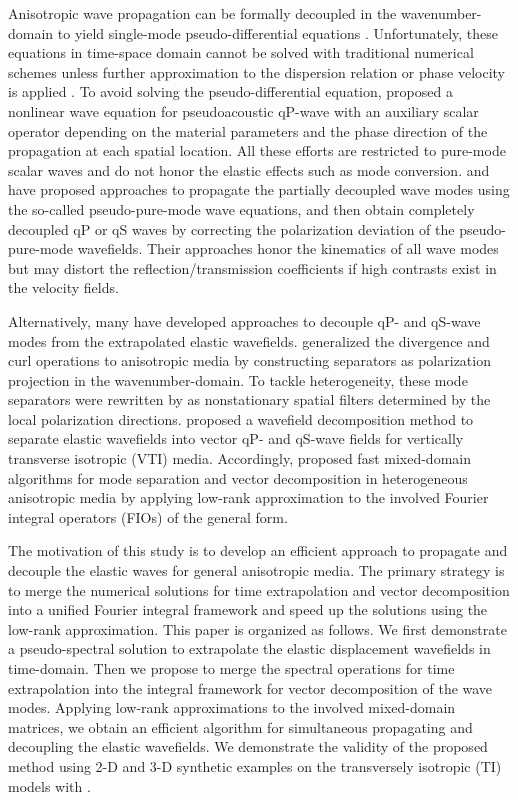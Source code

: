 Anisotropic wave propagation can be formally decoupled in the wavenumber-domain to
yield single-mode pseudo-differential equations \cite[]{liu:2009}. 
Unfortunately, these equations in time-space domain cannot be solved with traditional
numerical schemes unless further approximation to the dispersion relation or phase
velocity is applied
\cite[]{etgen:2009,chu:2011,fowler.king:2011,zhan:2012,song:2013,wu:2014,du:2014}.
To avoid solving the pseudo-differential equation, \cite{xu.zhou:2014}
proposed a nonlinear wave equation for pseudoacoustic qP-wave with an auxiliary
scalar operator depending on the material parameters and the phase direction of the
propagation at each spatial location.
All these efforts are restricted to pure-mode scalar waves and do not honor
the elastic effects such as mode conversion.
\cite{cheng.kang:2014} and \cite{kang.cheng:2012} have proposed approaches to propagate the
partially decoupled wave modes using the so-called pseudo-pure-mode wave equations,
 and then obtain completely decoupled qP or qS waves by
correcting the polarization deviation of the
pseudo-pure-mode wavefields.
Their approaches honor the kinematics of all wave modes
but may distort the reflection/transmission coefficients if high contrasts exist
in the velocity fields.

Alternatively, many have developed approaches to decouple qP- and qS-wave modes
from the extrapolated elastic wavefields.
\cite {dellinger.etgen:1990} generalized the divergence and curl operations to anisotropic media
by constructing separators as polarization projection in the wavenumber-domain.
To tackle heterogeneity, these mode separators were rewritten
by \cite{yan.sava:2009} as nonstationary spatial filters determined by the local
polarization directions.
\cite{zhang.mcmechan:2010} proposed a wavefield decomposition method to separate
elastic wavefields into vector qP- and qS-wave fields
for vertically transverse isotropic (VTI) media. 
Accordingly, \cite{cheng.fomel:2014} proposed fast mixed-domain algorithms
for mode separation and vector decomposition in heterogeneous anisotropic media by applying low-rank
approximation to the involved Fourier integral operators (FIOs) of the general form.

The motivation of this study is to develop an efficient approach to propagate and
decouple the elastic waves for general anisotropic media. The primary strategy is to
merge the numerical solutions for time extrapolation and vector decomposition into a unified
Fourier integral framework and speed up the solutions using the low-rank approximation.
This paper is organized as follows.
We first demonstrate a pseudo-spectral  solution to extrapolate the elastic displacement wavefields in
time-domain.
Then we propose to merge the spectral operations for time extrapolation into the
integral framework for vector decomposition of the wave modes. Applying
low-rank approximations to the involved mixed-domain matrices, we obtain
an efficient algorithm for simultaneous propagating and decoupling the elastic
wavefields.
We demonstrate the validity of the proposed method using 2-D and 3-D synthetic
examples on the transversely isotropic (TI)  models with .

